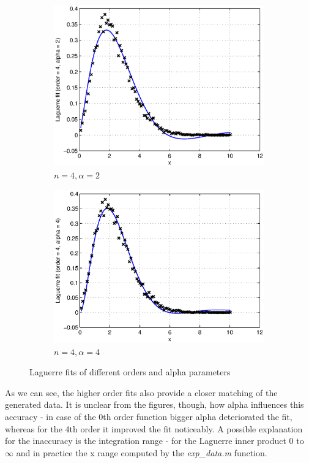 \documentclass[a4paper]{article}
\numberwithin{equation}{section}
\begin{document}
\begin{figure}[!ht]
\begin{subfigure}[t]{.3\textwidth}
			\includegraphics[width=\textwidth]{lfit_order4_alpha2.eps}
			\caption{$n=4, \alpha=2$}		
	\end{subfigure}
	\quad
	\begin{subfigure}[t]{.3\textwidth}
		\centering
		\includegraphics[width=\textwidth]{lfit_order4_alpha4.eps}
		\caption{$n=4, \alpha=4$}
	\end{subfigure}
	\caption{Laguerre fits of different orders and alpha parameters}
	\label{fig:difficultfits}
\end{figure}

\noindent As we can see, the higher order fits also provide a closer matching of the generated data. It is unclear from the figures, though, how alpha influences this accuracy - in case of the 0th order function bigger alpha deteriorated the fit, whereas for the 4th order it improved the fit noticeably. A possible explanation for the inaccuracy is the integration range - for the Laguerre inner product $0$ to $\infty$ and in practice the x range computed by the \textit{exp\_data.m} function.\\
\end{document}
